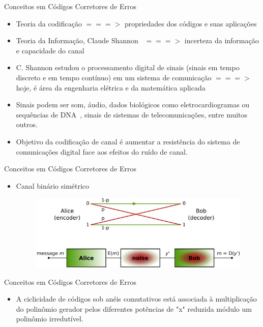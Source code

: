   \begin{frame}{Conceitos em Códigos Corretores de Erros}
     \begin{itemize}
        \item<1-> Teoria da codificação $===>$ propriedades dos códigos e suas aplicações
        \item<2-> Teoria da Informação, Claude Shannon~\cite{Shannon:1948} $===>$ incerteza da informação e capacidade do canal
        \item<3-> C. Shannon estudou o processamento digital de sinais (sinais em tempo discreto e em tempo contínuo) em um sistema de comunicação $===>$ hoje, é área da engenharia elétrica e da matemática aplicada
        \item<4-> Sinais podem ser som, áudio, dados biológicos como eletrocardiogramas ou sequências de DNA~\cite{Faria:2010,Faria:2012}, sinais de sistemas de telecomunicações, entre muitos outros.
        \item<5-> Objetivo da codificação de canal é aumentar a resistência do sistema de comunicações digital face aos efeitos do ruído de canal.
     \end{itemize}
  \end{frame}

  \begin{frame}{Conceitos em Códigos Corretores de Erros}
     \begin{itemize}
        \item<1-> Canal binário simétrico
    \begin{figure}[hb]
      \centering
      \includegraphics[scale=0.5]{600px-Binary_symmetric_channel.jpg}
    \end{figure}
     \end{itemize}
  \end{frame}

  \begin{frame}{Conceitos em Códigos Corretores de Erros}
     \begin{itemize}
        \item<1-> A ciclicidade de códigos sob anéis comutativos está associada à multiplicação do polinômio gerador pelos diferentes potências de "x" reduzida módulo um polinômio irredutível.
     \end{itemize}
  \end{frame}

